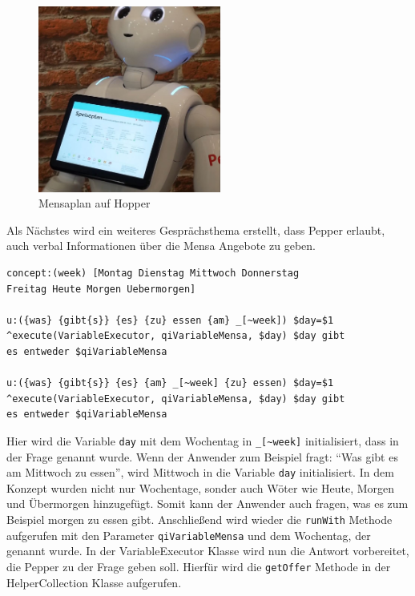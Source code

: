 \begin{figure}[H]
    \centering
    \includegraphics[width=6cm]{Figures/AppChapter/rx2.JPG}
    \caption{Mensaplan auf Hopper}
    \label{fig:mensaplanPepper}
    \centering
\end{figure}

Als Nächstes wird ein weiteres Gesprächsthema erstellt, dass Pepper erlaubt, auch verbal Informationen über die Mensa Angebote zu geben.\\

\begin{lstlisting}[caption={Topic - Mensadaten}]
concept:(week) [Montag Dienstag Mittwoch Donnerstag 
Freitag Heute Morgen Uebermorgen]

u:({was} {gibt{s}} {es} {zu} essen {am} _[~week]) $day=$1 
^execute(VariableExecutor, qiVariableMensa, $day) $day gibt 
es entweder $qiVariableMensa

u:({was} {gibt{s}} {es} {am} _[~week] {zu} essen) $day=$1 
^execute(VariableExecutor, qiVariableMensa, $day) $day gibt 
es entweder $qiVariableMensa
\end{lstlisting}

Hier wird die Variable \verb|day| mit dem Wochentag in  \verb|_[~week]| initialisiert, dass in der Frage genannt wurde. Wenn der Anwender zum Beispiel fragt: ``Was gibt es am Mittwoch zu essen'', wird Mittwoch in die Variable \verb|day| initialisiert. In dem Konzept wurden nicht nur Wochentage, sonder auch Wöter wie Heute, Morgen und Übermorgen hinzugefügt. Somit kann der Anwender auch fragen, was es zum Beispiel morgen zu essen gibt. Anschließend wird wieder die \verb|runWith| Methode aufgerufen mit den Parameter \verb|qiVariableMensa| und dem Wochentag, der genannt wurde. In der VariableExecutor Klasse wird nun die Antwort vorbereitet, die Pepper zu der Frage geben soll. Hierfür wird die \verb|getOffer| Methode in 
der HelperCollection Klasse aufgerufen.\\

